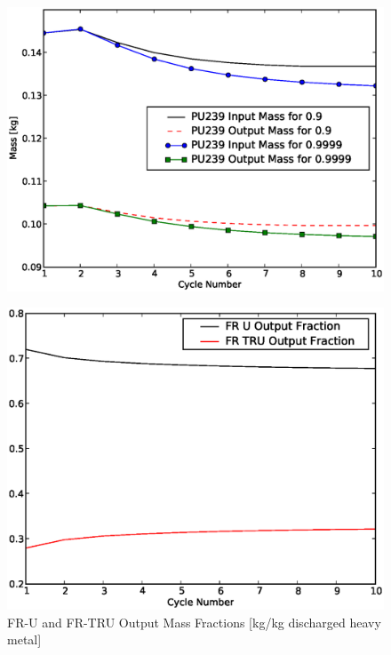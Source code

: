 \begin{figure}[htbp]
\begin{center}
\includegraphics[scale=0.3]{se_sensitivity/figs/PU239InOutSepEff.eps}
\end{center}
\end{figure}


\begin{figure}[htbp]
\caption{FR-U and FR-TRU Output Mass Fractions [kg/kg discharged heavy metal]}
\label{ses_fig08}
\begin{center}
\includegraphics[scale=0.5]{se_sensitivity/figs/FRfracOut.eps}
\end{center}
\end{figure}


